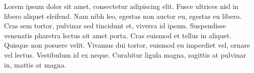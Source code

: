 \documentclass[a4paper, 12pt]{article}
\begin{document}
Lorem ipsum dolor sit amet, consectetur adipiscing elit. Fusce ultrices nisl in libero aliquet eleifend. Nam nibh leo, egestas non auctor eu, egestas eu libero. Cras sem tortor, pulvinar sed tincidunt et, viverra id ipsum. Suspendisse venenatis pharetra lectus sit amet porta. Cras euismod et tellus in aliquet. Quisque non posuere velit. Vivamus dui tortor, euismod eu imperdiet vel, ornare vel lectus. Vestibulum id ex neque. Curabitur ligula magna, sagittis at pulvinar in, mattis at magna.





\nocite{*}
\end{document}
